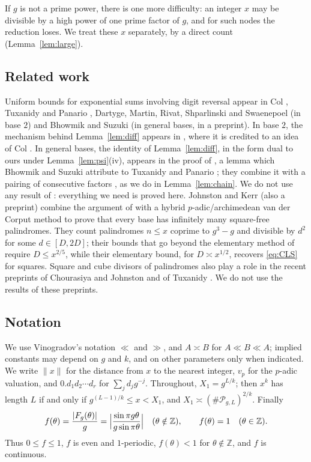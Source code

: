 \documentclass[11pt]{amsart}
\theoremstyle{definition}
\numberwithin{equation}{section}
\newcommand{\cP}{\mathcal{P}}
\newcommand{\Z}{\mathbb{Z}}
\begin{document}
If $g$ is not a prime power, there is one more difficulty: an integer $x$ may be
divisible by a high power of one prime factor of $g$, and for such nodes
the reduction loses. We treat these $x$ separately, by a direct count
(Lemma~\ref{lem:large}).

\subsection{Related work}
Uniform bounds for exponential sums involving digit reversal appear in
Col \cite{Col}, Tuxanidy and Panario \cite{TP}, Dartyge, Martin, Rivat,
Shparlinski and Swaenepoel \cite{DMRSS} (in base $2$) and Bhowmik and Suzuki
\cite{BhS} (in general bases, in a preprint). In base $2$, the mechanism
behind Lemma~\ref{lem:diff} appears in \cite[Lemmas~2.5 and~2.6]{DMRSS},
where it is credited to an idea of Col \cite[proof of Lemme~2]{Col}. In
general bases, the identity of Lemma~\ref{lem:diff}, in the form dual to
ours under Lemma~\ref{lem:psi}(iv), appears in the proof of
\cite[Lemma~4.6]{BhS}, a lemma which Bhowmik and Suzuki attribute to
Tuxanidy and Panario \cite{TP}; they
combine it with a pairing of consecutive factors \cite[Lemmas~4.7
and~4.9]{BhS}, as we do in Lemma~\ref{lem:chain}. We do not use any result
of \cite{BhS}: everything we need is proved here. Johnston and Kerr
\cite{JK} (also a preprint) combine the argument of \cite{CLS} with a
hybrid $p$-adic/archimedean van der Corput method to prove that every base
has infinitely many square-free palindromes. They count palindromes
$n\le x$ coprime to $g^3-g$ and divisible by $d^2$ for some $d\in[D,2D]$;
their bounds that go beyond the elementary method of \cite{CLS} require
$D\le x^{2/5}$, while their elementary bound, for $D\asymp x^{1/2}$,
recovers \eqref{eq:CLS} for squares. Square and cube divisors of
palindromes also play a role in the recent preprints of Chourasiya and
Johnston \cite{CJ} and of Tuxanidy \cite{Tux}. We do not use the results
of these preprints.

\subsection{Notation}
We use Vinogradov's notation $\ll$ and $\gg$, and $A\asymp B$ for
$A\ll B\ll A$; implied constants may depend on $g$ and $k$, and on other
parameters only when indicated. We write $\|x\|$ for the distance from $x$
to the nearest integer, $v_p$ for the $p$-adic valuation, and
$0.d_1d_2\cdots d_r$ for $\sum_jd_jg^{-j}$. Throughout,
$X_1=g^{L/k}$; then $x^k$ has length $L$ if and only if
$g^{(L-1)/k}\le x<X_1$, and $X_1\asymp(\#\cP_{g,L})^{2/k}$. Finally
\[
f(\theta)=\frac{|F_g(\theta)|}{g}=\Bigl|\frac{\sin\pi g\theta}{g\sin\pi\theta}\Bigr|\quad(\theta\notin\Z),\qquad f(\theta)=1\quad(\theta\in\Z).
\]
Thus $0\le f\le1$, $f$ is even and $1$-periodic, $f(\theta)<1$ for
$\theta\notin\Z$, and $f$ is continuous.
\end{document}
